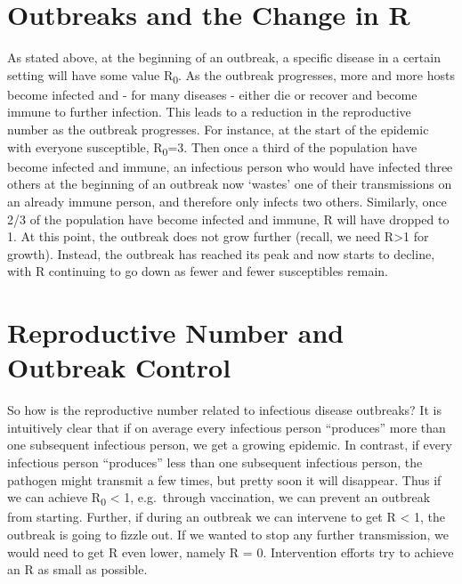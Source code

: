 \documentclass[]{book}
\theoremstyle{definition}
\theoremstyle{definition}
\theoremstyle{definition}
\theoremstyle{remark}
\begin{document}
\section{Outbreaks and the Change in
R}\label{outbreaks-and-the-change-in-r}

As stated above, at the beginning of an outbreak, a specific disease in
a certain setting will have some value R\textsubscript{0}. As the
outbreak progresses, more and more hosts become infected and - for many
diseases - either die or recover and become immune to further infection.
This leads to a reduction in the reproductive number as the outbreak
progresses. For instance, at the start of the epidemic with everyone
susceptible, R\textsubscript{0}=3. Then once a third of the population
have become infected and immune, an infectious person who would have
infected three others at the beginning of an outbreak now `wastes' one
of their transmissions on an already immune person, and therefore only
infects two others. Similarly, once 2/3 of the population have become
infected and immune, R will have dropped to 1. At this point, the
outbreak does not grow further (recall, we need R\textgreater{}1 for
growth). Instead, the outbreak has reached its peak and now starts to
decline, with R continuing to go down as fewer and fewer susceptibles
remain.

\section{Reproductive Number and Outbreak
Control}\label{reproductive-number-and-outbreak-control}

So how is the reproductive number related to infectious disease
outbreaks? It is intuitively clear that if on average every infectious
person ``produces'' more than one subsequent infectious person, we get a
growing epidemic. In contrast, if every infectious person ``produces''
less than one subsequent infectious person, the pathogen might transmit
a few times, but pretty soon it will disappear. Thus if we can achieve
R\textsubscript{0} \textless{} 1, e.g.~through vaccination, we can
prevent an outbreak from starting. Further, if during an outbreak we can
intervene to get R \textless{} 1, the outbreak is going to fizzle out.
If we wanted to stop any further transmission, we would need to get R
even lower, namely R = 0. Intervention efforts try to achieve an R as
small as possible.
\end{document}

